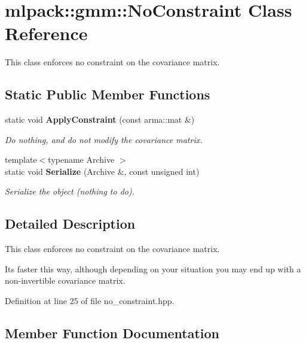 \section{mlpack\+:\+:gmm\+:\+:No\+Constraint Class Reference}
\label{classmlpack_1_1gmm_1_1NoConstraint}


This class enforces no constraint on the covariance matrix.  


\subsection*{Static Public Member Functions}
\begin{DoxyCompactItemize}
\item 
static void {\bf Apply\+Constraint} (const arma\+::mat \&)
\begin{DoxyCompactList}\small\item\em Do nothing, and do not modify the covariance matrix. \end{DoxyCompactList}\item 
{\footnotesize template$<$typename Archive $>$ }\\static void {\bf Serialize} (Archive \&, const unsigned int)
\begin{DoxyCompactList}\small\item\em Serialize the object (nothing to do). \end{DoxyCompactList}\end{DoxyCompactItemize}


\subsection{Detailed Description}
This class enforces no constraint on the covariance matrix. 

It\textquotesingle{}s faster this way, although depending on your situation you may end up with a non-\/invertible covariance matrix. 

Definition at line 25 of file no\+\_\+constraint.\+hpp.



\subsection{Member Function Documentation}
